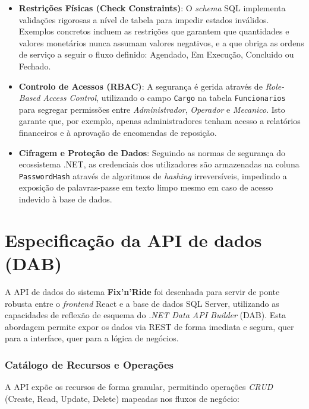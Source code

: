 \documentclass[a4paper,12pt]{scrreprt}
\begin{document}
\begin{itemize}
\item \textbf{Restrições Físicas (Check Constraints)}: O \textit{schema} SQL implementa validações rigorosas a nível de tabela para impedir estados inválidos. Exemplos concretos incluem as restrições que garantem que quantidades e valores monetários nunca assumam valores negativos, e a que obriga as ordens de serviço a seguir o fluxo definido: Agendado, Em Execução, Concluido ou Fechado.
\item \textbf{Controlo de Acessos (RBAC)}: A segurança é gerida através de \textit{Role-Based Access Control}, utilizando o campo \texttt{Cargo} na tabela \texttt{Funcionarios} para segregar permissões entre \textit{Administrador}, \textit{Operador} e \textit{Mecanico}. Isto garante que, por exemplo, apenas administradores tenham acesso a relatórios financeiros e à aprovação de encomendas de reposição.
\item \textbf{Cifragem e Proteção de Dados}: Seguindo as normas de segurança do ecossistema .NET, as credenciais dos utilizadores são armazenadas na coluna \texttt{PasswordHash} através de algoritmos de \textit{hashing} irreversíveis, impedindo a exposição de palavras-passe em texto limpo mesmo em caso de acesso indevido à base de dados.
\end{itemize}

\section{Especificação da API de dados (DAB)}
A API de dados do sistema \textbf{Fix'n'Ride} foi desenhada para servir de ponte robusta entre o \textit{frontend} React e a base de dados SQL Server, utilizando as capacidades de reflexão de esquema do \textit{.NET Data API Builder} (DAB). Esta abordagem permite expor os dados via REST de forma imediata e segura, quer para a interface, quer para a lógica de negócios. 

\subsubsection{Catálogo de Recursos e Operações}
A API expõe os recursos de forma granular, permitindo operações \textit{CRUD} (Create, Read, Update, Delete) mapeadas nos fluxos de negócio:
\end{document}
